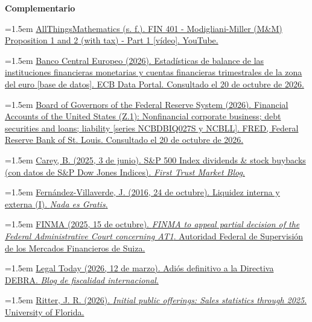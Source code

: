 \documentclass[10pt,a4paper]{article}
\begin{document}
\textbf{Complementario}

\noindent\hangindent=1.5em \href{https://www.youtube.com/watch?v=DoLc5CCqd3g}{AllThingsMathematics (s. f.). FIN 401 - Modigliani-Miller (M\&M) Proposition 1 and 2 (with tax) - Part 1 [vídeo]. YouTube.}

\noindent\hangindent=1.5em \href{https://data.ecb.europa.eu/}{Banco Central Europeo (2026). Estadísticas de balance de las instituciones financieras monetarias y cuentas financieras trimestrales de la zona del euro [base de datos]. ECB Data Portal. Consultado el 20 de octubre de 2026.}

\noindent\hangindent=1.5em \href{https://fred.stlouisfed.org/series/NCBDBIQ027S}{Board of Governors of the Federal Reserve System (2026). Financial Accounts of the United States (Z.1): Nonfinancial corporate business; debt securities and loans; liability [series NCBDBIQ027S y NCBLL]. FRED, Federal Reserve Bank of St. Louis. Consultado el 20 de octubre de 2026.}

\noindent\hangindent=1.5em \href{https://www.ftportfolios.com/Blogs/MarketBlog/2025/6/3/sp-500-index-dividends--stock-buybacks}{Carey, B. (2025, 3 de junio). S\&P 500 Index dividends \& stock buybacks (con datos de S\&P Dow Jones Indices). \textit{First Trust Market Blog}.}

\noindent\hangindent=1.5em \href{https://nadaesgratis.es/fernandez-villaverde/liquidez-interna-y-externa-i}{Fernández-Villaverde, J. (2016, 24 de octubre). Liquidez interna y externa (I). \textit{Nada es Gratis}.}

\noindent\hangindent=1.5em \href{https://www.finma.ch/en/news/2025/10/20251015-meldung-bvger-at1/}{FINMA (2025, 15 de octubre). \textit{FINMA to appeal partial decision of the Federal Administrative Court concerning AT1}. Autoridad Federal de Supervisión de los Mercados Financieros de Suiza.}

\noindent\hangindent=1.5em \href{https://www.legaltoday.com/opinion/blogs/fiscal-y-legal/blog-fiscalidad-internacional/adios-definitivo-a-la-directiva-debra-2026-03-12/}{Legal Today (2026, 12 de marzo). Adiós definitivo a la Directiva DEBRA. \textit{Blog de fiscalidad internacional}.}

\noindent\hangindent=1.5em \href{https://site.warrington.ufl.edu/ritter/files/IPOs-Sales.pdf}{Ritter, J. R. (2026). \textit{Initial public offerings: Sales statistics through 2025}. University of Florida.}
\end{document}
